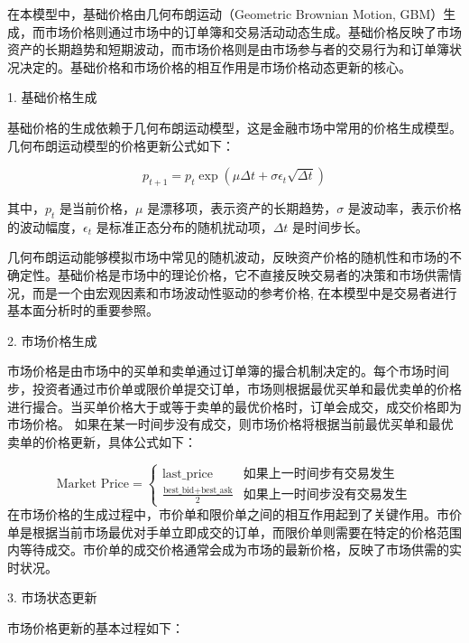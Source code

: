 在本模型中，基础价格由几何布朗运动（Geometric Brownian Motion, GBM）生成，而市场价格则通过市场中的订单簿和交易活动动态生成。基础价格反映了市场资产的长期趋势和短期波动，而市场价格则是由市场参与者的交易行为和订单簿状况决定的。基础价格和市场价格的相互作用是市场价格动态更新的核心。

1. 基础价格生成

基础价格的生成依赖于几何布朗运动模型，这是金融市场中常用的价格生成模型。几何布朗运动模型的价格更新公式如下：

\begin{equation}
    p_{t+1} = p_t \exp\left( \mu \Delta t + \sigma \epsilon_t \sqrt{\Delta t} \right)
\end{equation}

其中，\( p_t \) 是当前价格，\( \mu \) 是漂移项，表示资产的长期趋势，\( \sigma \) 是波动率，表示价格的波动幅度，\( \epsilon_t \) 是标准正态分布的随机扰动项，\(\Delta t\) 是时间步长。

几何布朗运动能够模拟市场中常见的随机波动，反映资产价格的随机性和市场的不确定性。基础价格是市场中的理论价格，它不直接反映交易者的决策和市场供需情况，而是一个由宏观因素和市场波动性驱动的参考价格, 在本模型中是交易者进行基本面分析时的重要参照。

2. 市场价格生成

市场价格是由市场中的买单和卖单通过订单簿的撮合机制决定的。每个市场时间步，投资者通过市价单或限价单提交订单，市场则根据最优买单和最优卖单的价格进行撮合。当买单价格大于或等于卖单的最优价格时，订单会成交，成交价格即为市场价格。
如果在某一时间步没有成交，则市场价格将根据当前最优买单和最优卖单的价格更新，具体公式如下：

\begin{equation}
    \text{Market Price} = 
    \begin{cases} 
    \text{last\_price} & \text{如果上一时间步有交易发生} \\
    \frac{\text{best\_bid} + \text{best\_ask}}{2} & \text{如果上一时间步没有交易发生}
    \end{cases}
\end{equation}
在市场价格的生成过程中，市价单和限价单之间的相互作用起到了关键作用。市价单是根据当前市场最优对手单立即成交的订单，而限价单则需要在特定的价格范围内等待成交。市价单的成交价格通常会成为市场的最新价格，反映了市场供需的实时状况。





3. 市场状态更新

市场价格更新的基本过程如下：

